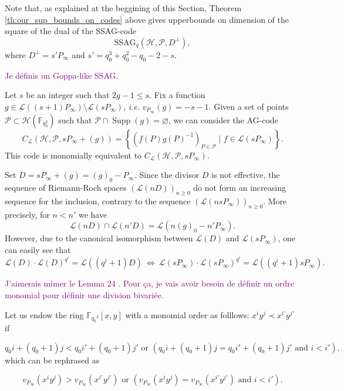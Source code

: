 \documentclass[a4paper]{article}
\newtheorem{coro1}{Corollary}
\newcommand{\calP}{\mathcal{P}}
\newcommand{\calH}{\mathcal{H}}
\newcommand{\calL}{\mathcal{L}}
\newcommand{\F}{\mathbb{F}}
\newcommand{\set}[1]{\left\{#1\right\}}
\DeclareMathOperator{\Supp}{Supp}
\newcommand\jade[1]{\textcolor{purple}{#1}}
\begin{document}
Note that, as explained at the beggining of this Section, Theorem \ref{th:our_sup_bounds_on_codes} above gives upperbounds on dimension of the square of the dual of the \textrm{SSAG}-code
\[\mathrm{SSAG}_{q}(\calH,\calP,D^{\perp}),\]
where $D^{\perp} = s' P_{\infty}$ and $s'= q_0^3+q_0^2-q_0-2-s$.



\clearpage

\jade{Je définis un Goppa-like SSAG.}

Let $s$ be an integer such that $2g-1 \leq s$. Fix a function $g \in \calL((s+1)P_\infty) \setminus \calL(sP_\infty)$, \textit{i.e.} $v_{P_\infty}(g)=-s-1$. 
Given a set of points  $\calP \subset \calH(\F_{q_0^2})$ such that $\calP \cap \Supp(g) = \varnothing$, we can consider the AG-code 
\[C_{\calL}(\calH,\calP,sP_\infty+(g))=\set{\left(f(P)g(P)^{-1}\right)_{P \in \calP} \mid f \in \calL(sP_\infty)}.\]
This code is monomially equivalent to $C_{\calL}(\calH,\calP,sP_\infty)$.


Set $D=sP_\infty+(g)=(g)_0-P_\infty$. Since the divisor $D$ is not effective, the sequence of Riemann-Roch spaces $\left(\calL(nD)\right)_{n \geq 0}$ do not form an increasing sequence for the inclusion, contrary to the sequence $\left(\calL(nsP_\infty)\right)_{n\geq 0}$. More precisely, for $n<n'$ we have
\[\calL(nD) \cap \calL(n'D) = \calL\left(n(g)_0-n'P_\infty\right).\]
However, due to the canonical isomorphism between $\calL(D)$ and $\calL(sP_\infty)$, one can easily see that
\[\calL(D)\cdot \calL(D)^{q^i} = \calL((q^i+1)D) \: \Leftrightarrow \: \calL(sP_\infty)\cdot \calL(sP_\infty)^{q^i} = \calL((q^i+1)sP_\infty).\]

\jade{J'aimerais mimer le Lemma 24 \cite{rocco}. Pour ça, je vais avoir besoin de définir un ordre monomial pour définir une division bivariée.}

Let us endow the ring $\F_{{q_0}^2}[x,y]$ with a monomial order as folllows: $x^iy^j \prec x^{i'}y^{j'}$ if

\[ q_0i +(q_0+1)j < q_0i' +(q_0+1)j' \text{ or } \left(q_0i +(q_0+1)j = q_0i' +(q_0+1)j' \text{ and } i < i'\right),\]
which can be rephrased as 

\[ v_{P_\infty}\left(x^iy^j\right) > v_{P_\infty}\left(x^{i'}y^{j'}\right) \text{ or } \left(v_{P_\infty}\left(x^iy^j\right) = v_{P_\infty}\left(x^{i'}y^{j'}\right) \text{ and } i < i'\right).\]
\end{document}
